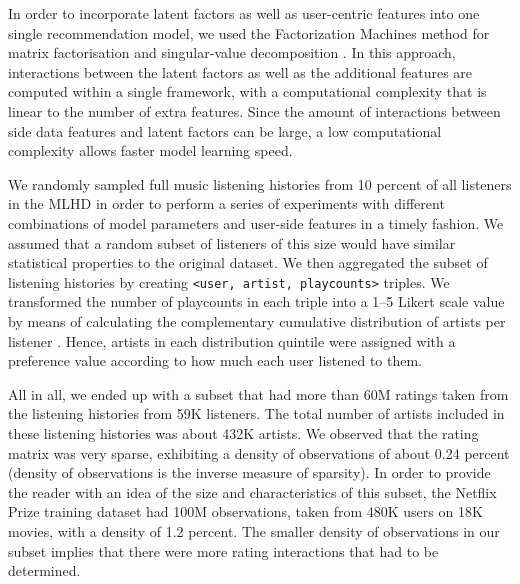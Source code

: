 In order to incorporate latent factors as well as user-centric features into one single recommendation model, we used the Factorization Machines me\-thod for matrix factorisation and singular-value decomposition \autocite{rendle10factorization}. 
In this approach, interactions between the latent factors as well as the additional features are computed within a single framework, with a computational complexity that is linear to the number of extra features. 
Since the amount of interactions between side data features and latent factors can be large, a low computational complexity allows faster model learning speed.

We randomly sampled full music listening histories from 10 percent of all listeners in the MLHD in order to perform a series of experiments with different combinations of model parameters and user-side features in a timely fashion. We assumed that a random subset of listeners of this size would have similar statistical properties to the original dataset. 
We then aggregated the subset of listening histories by creating \small{\texttt{<user, artist, playcounts>}} \normalsize triples. 
We transformed the number of playcounts in each triple into a 1--5 Likert scale value by means of calculating the complementary cumulative distribution of artists per listener \autocite{celma10music}. Hence, artists in each distribution quintile were assigned with a preference value according to how much each user listened to them.

All in all, we ended up with a subset that had more than 60M ratings taken from the listening histories from 59K listeners. The total number of artists included in these listening histories was about 432K artists. We observed that the rating matrix was very sparse, exhibiting a density of observations of about 0.24 percent (density of observations is the inverse measure of sparsity).
In order to provide the reader with an idea of the size and characteristics of this subset, the Netflix Prize training dataset had 100M observations, taken from 480K users on 18K movies, with a density of 1.2 percent. 
The smaller density of observations in our subset implies that there were more rating interactions that had to be determined. 


